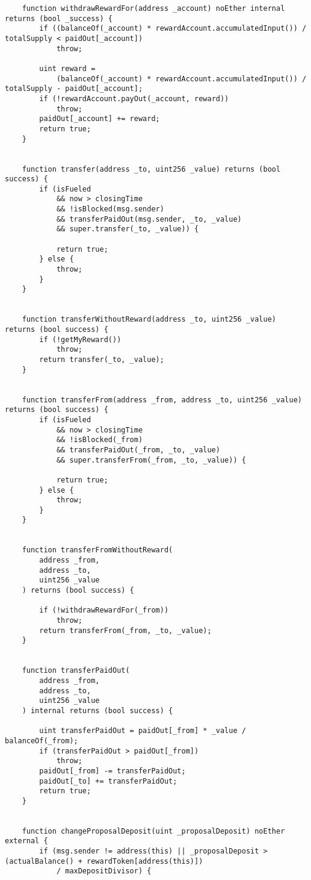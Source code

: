 \documentclass[9pt,oneside]{amsart}
\begin{document}
\begin{appendix}
\begin{verbatim}
    function withdrawRewardFor(address _account) noEther internal returns (bool _success) {
        if ((balanceOf(_account) * rewardAccount.accumulatedInput()) / totalSupply < paidOut[_account])
            throw;

        uint reward =
            (balanceOf(_account) * rewardAccount.accumulatedInput()) / totalSupply - paidOut[_account];
        if (!rewardAccount.payOut(_account, reward))
            throw;
        paidOut[_account] += reward;
        return true;
    }


    function transfer(address _to, uint256 _value) returns (bool success) {
        if (isFueled
            && now > closingTime
            && !isBlocked(msg.sender)
            && transferPaidOut(msg.sender, _to, _value)
            && super.transfer(_to, _value)) {

            return true;
        } else {
            throw;
        }
    }


    function transferWithoutReward(address _to, uint256 _value) returns (bool success) {
        if (!getMyReward())
            throw;
        return transfer(_to, _value);
    }


    function transferFrom(address _from, address _to, uint256 _value) returns (bool success) {
        if (isFueled
            && now > closingTime
            && !isBlocked(_from)
            && transferPaidOut(_from, _to, _value)
            && super.transferFrom(_from, _to, _value)) {

            return true;
        } else {
            throw;
        }
    }


    function transferFromWithoutReward(
        address _from,
        address _to,
        uint256 _value
    ) returns (bool success) {

        if (!withdrawRewardFor(_from))
            throw;
        return transferFrom(_from, _to, _value);
    }


    function transferPaidOut(
        address _from,
        address _to,
        uint256 _value
    ) internal returns (bool success) {

        uint transferPaidOut = paidOut[_from] * _value / balanceOf(_from);
        if (transferPaidOut > paidOut[_from])
            throw;
        paidOut[_from] -= transferPaidOut;
        paidOut[_to] += transferPaidOut;
        return true;
    }


    function changeProposalDeposit(uint _proposalDeposit) noEther external {
        if (msg.sender != address(this) || _proposalDeposit > (actualBalance() + rewardToken[address(this)])
            / maxDepositDivisor) {


\end{verbatim}
\end{appendix}
\end{document}
